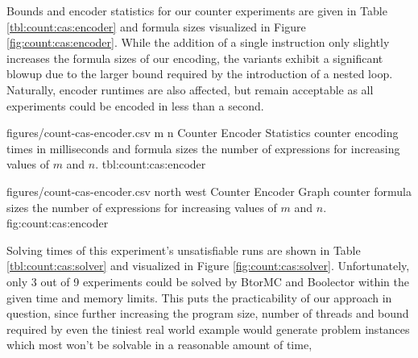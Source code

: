 \newpage

Bounds and encoder statistics for our  counter experiments are given in Table \ref{tbl:count:cas:encoder} and formula sizes visualized in Figure \ref{fig:count:cas:encoder}.
While the addition of a single instruction only slightly increases the formula sizes of our {\BTOR} encoding, the {\SMTLIB} variants exhibit a significant blowup due to the larger bound required by the introduction of a nested loop.
Naturally, encoder runtimes are also affected, but remain acceptable as all experiments could be encoded in less than a second.

\bigbreak

\EncoderStatsTable
  {figures/count-cas-encoder.csv}
  {m n}
  {\CountRowHeader}
  { Counter Encoder Statistics}
  { counter encoding times in milliseconds and formula sizes  the number of expressions for increasing values of $m$ and $n$.}
  {tbl:count:cas:encoder}

\EncoderStatsGraph
  {figures/count-cas-encoder.csv}
  {north west}
  { Counter Encoder Graph}
  { counter formula sizes  the number of expressions for increasing values of $m$ and $n$.}
  {fig:count:cas:encoder}

\newpage

Solving times of this experiment's unsatisfiable runs are shown in Table \ref{tbl:count:cas:solver} and visualized in Figure \ref{fig:count:cas:solver}.
Unfortunately, only 3 out of 9 experiments could be solved by BtorMC and Boolector within the given time and memory limits.
This puts the practicability of our approach in question, since further increasing the program size, number of threads and bound required by even the tiniest real world example
would generate problem instances which most  won't be solvable in a reasonable amount of time,


